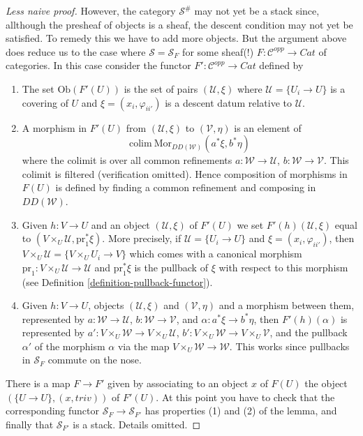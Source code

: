 \begin{proof}[Less naive proof]
\medskip\noindent
However, the category $\mathcal{S}^\#$ may not yet be a
stack since, allthough the presheaf of objects is a sheaf,
the descent condition may not yet be satisfied.
To remedy this we have to add more objects. But the argument
above does reduce us to the case where $\mathcal{S} = \mathcal{S}_F$
for some sheaf(!) $F : \mathcal{C}^{opp} \to \textit{Cat}$ of
categories. In this case consider the functor
$F' : \mathcal{C}^{opp} \to \textit{Cat}$ defined by
\begin{enumerate}
\item The set $\text{Ob}(F'(U))$ is the set of pairs
$(\mathcal{U}, \xi)$ where $\mathcal{U} = \{U_i \to U\}$
is a covering of $U$ and $\xi = (x_i, \varphi_{ii'})$ is
a descent datum relative to $\mathcal{U}$.
\item A morphism in $F'(U)$ from
$(\mathcal{U}, \xi)$ to $(\mathcal{V}, \eta)$
is an element of
$$
\text{colim}\ \text{Mor}_{DD(\mathcal{W})}(a^*\xi, b^*\eta)
$$
where the colimit is over all common refinements
$a : \mathcal{W} \to \mathcal{U}$, $b : \mathcal{W} \to \mathcal{V}$.
This colimit is filtered (verification omitted).
Hence composition of morphisms in $F(U)$ is defined by
finding a common refinement and composing in $DD(\mathcal{W})$.
\item Given $h : V \to U$ and an object
$(\mathcal{U}, \xi)$ of $F'(U)$ we set $F'(h)(\mathcal{U}, \xi)$
equal to $(V \times_U \mathcal{U}, \text{pr}_1^*\xi)$.
More precisely, if $\mathcal{U} = \{U_i \to U\}$
and $\xi = (x_i, \varphi_{ii'})$, then
$V \times_U \mathcal{U} = \{V \times_U U_i \to V\}$
which comes with a canonical morphism
$\text{pr}_1 : V \times_U \mathcal{U} \to \mathcal{U}$ and
$\text{pr}_1^*\xi$ is the pullback of $\xi$ with respect to
this morphism (see Definition \ref{definition-pullback-functor}).
\item Given $h : V \to U$, objects $(\mathcal{U}, \xi)$ 
and $(\mathcal{V}, \eta)$ and a morphism between them, represented by
$a : \mathcal{W} \to \mathcal{U}$, $b : \mathcal{W} \to \mathcal{V}$,
and $\alpha : a^*\xi \to b^*\eta$, then $F'(h)(\alpha)$ is
represented by
$a' : V\times_U\mathcal{W} \to V\times_U\mathcal{U}$,
$b' : V\times_U\mathcal{W} \to V\times_U\mathcal{V}$,
and the pullback $\alpha'$ of the morphism $\alpha$ via
the map $V \times_U \mathcal{W} \to \mathcal{W}$. This works
since pullbacks in $\mathcal{S}_F$ commute on the nose.
\end{enumerate}
There is a map $F \to F'$ given by associating to
an object $x$ of $F(U)$ the object $(\{U \to U\}, (x, triv))$ of
$F'(U)$. At this point you have to check that the corresponding
functor $\mathcal{S}_F \to \mathcal{S}_{F'}$ has properties (1)
and (2) of the lemma, and finally that $\mathcal{S}_{F'}$ is
a stack. Details omitted.
\end{proof}

